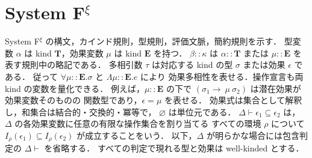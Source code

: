\section{\texorpdfstring{System F$^{\xi}$}{System Fξ}}

System F$^{\xi}$ の構文，カインド規則，型規則，評価文脈，簡約規則を示す．
型変数 $\alpha$ は kind $\mathbf{T}$，効果変数 $\mu$ は kind $\mathbf{E}$ を持つ．
$\beta::\kappa$ は $\alpha::\mathbf{T}$ または
$\mu::\mathbf{E}$ を表す規則中の略記である．
多相引数 $\tau$ は対応する kind の型 $\sigma$ または効果 $\epsilon$ である．
従って
$\forall\mu::\mathbf{E}.\sigma$ と $\Lambda\mu::\mathbf{E}.e$ により
効果多相性を表せる．操作宣言も両 kind の変数を量化できる．
例えば，$\mu::\mathbf{E}$ の下で
$(\sigma_1\rightarrow~\mu~\sigma_2)$ は潜在効果が効果変数そのものの
関数型であり，$\epsilon=\mu$ を表せる．
効果式は集合として解釈し，和集合は結合的・交換的・冪等で，
$\varnothing$ は単位元である．
$\Delta\vdash\epsilon_1\subseteq\epsilon_2$ は，
$\Delta$ の各効果変数に任意の有限な操作集合を割り当てる
すべての環境 $\rho$ について
$I_\rho(\epsilon_1)\subseteq I_\rho(\epsilon_2)$
が成立することをいう．
以下，$\Delta$ が明らかな場合には包含判定の $\Delta\vdash$ を省略する．
すべての判定で現れる型と効果は well-kinded とする．






\clearpage


